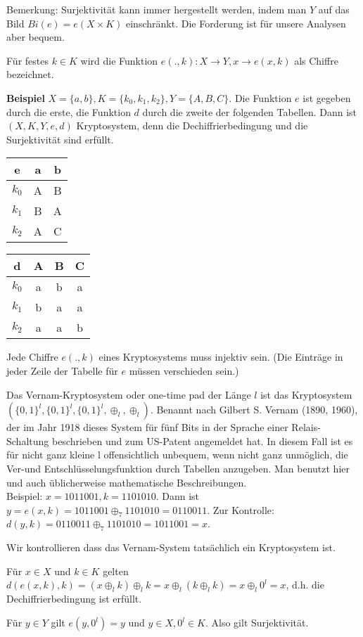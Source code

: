 \documentclass[a4paper]{article}
\begin{document}
\begin{multicols}{3}
    Bemerkung: Surjektivität kann immer hergestellt werden, indem man $Y$ auf das Bild $Bi(e) =e(X\times K)$ einschränkt. Die Forderung ist für unsere Analysen aber bequem.

    Für festes $k\in K$ wird die Funktion $e(.,k):X\rightarrow Y,x \rightarrow e(x,k)$ als Chiffre bezeichnet.

    \textbf{Beispiel} $X=\{a,b\},K=\{k_0,k_1,k_2\},Y=\{A,B,C\}$. Die Funktion $e$ ist gegeben durch die erste, die Funktion $d$ durch die zweite der folgenden Tabellen. Dann ist $(X,K,Y,e,d)$ Kryptosystem, denn die Dechiffrierbedingung und die Surjektivität sind erfüllt.

    \begin{tabular}{c|c|c}
        e     & a & b \\\hline
        $k_0$ & A & B \\
        $k_1$ & B & A \\
        $k_2$ & A & C
    \end{tabular}

    \begin{tabular}{c|c|c|c}
        d     & A & B & C \\\hline
        $k_0$ & a & b & a \\
        $k_1$ & b & a & a \\
        $k_2$ & a & a & b
    \end{tabular}

    Jede Chiffre $e(.,k)$ eines Kryptosystems muss injektiv sein. (Die Einträge in jeder Zeile der Tabelle für $e$ müssen verschieden sein.)

    Das Vernam-Kryptosystem oder one-time pad der Länge $l$ ist das Kryptosystem $(\{0,1\}^l,\{0,1\}^l,\{0,1\}^l,\oplus_l,\oplus_l)$. Benannt nach Gilbert S. Vernam (1890, 1960), der im Jahr 1918 dieses System für fünf Bits in der Sprache einer Relais-Schaltung beschrieben und zum US-Patent angemeldet hat.
    In diesem Fall ist es für nicht ganz kleine l offensichtlich unbequem, wenn nicht ganz unmöglich, die Ver-und Entschlüsselungsfunktion durch Tabellen anzugeben. Man benutzt hier und auch üblicherweise mathematische Beschreibungen.\\
    Beispiel: $x=1011001,k=1101010$. Dann ist $y=e(x,k)=1011001\oplus_7 1101010 = 0110011$. Zur Kontrolle: $d(y,k) = 0110011\oplus_7 1101010 = 1011001 =x$.

    Wir kontrollieren dass das Vernam-System tatsächlich ein Kryptosystem ist.
    \begin{enumerate*}
        \item Für $x\in X$ und $k\in K$ gelten $d(e(x,k),k)=(x\oplus_l k)\oplus_l k=x\oplus_l(k\oplus_l k) =x\oplus_l 0^l=x$, d.h. die Dechiffrierbedingung ist erfüllt.
        \item Für $y\in Y$ gilt $e(y,0^l) =y$ und $y\in X,0^l\in K$. Also gilt Surjektivität.
    \end{enumerate*}


\end{multicols}
\end{document}
